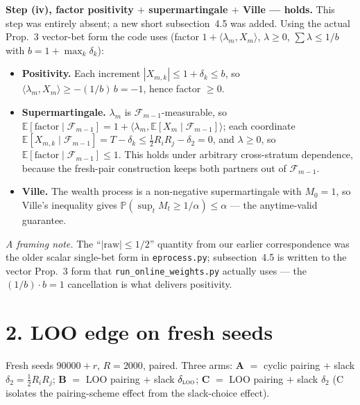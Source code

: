 \documentclass[11pt,a4paper]{article}
\begin{document}
\medskip
\noindent\textbf{Step (iv), factor positivity $+$ supermartingale $+$ Ville ---
holds.} This step was entirely absent; a new short subsection~4.5 was added.
Using the actual Prop.~3 vector-bet form the code uses
(factor $1 + \langle \lambda_m, X_m \rangle$, $\lambda \ge 0$,
$\sum \lambda \le 1/b$ with $b = 1 + \max_k \delta_k$):
\begin{itemize}
\item[(a)] \textbf{Positivity.} Each increment $|X_{m,k}| \le 1 + \delta_k \le b$,
  so $\langle \lambda_m, X_m \rangle \ge -(1/b)\,b = -1$, hence factor $\ge 0$.
\item[(b)] \textbf{Supermartingale.} $\lambda_m$ is
  $\mathcal{F}_{m-1}$-measurable, so
  $\mathbb{E}[\text{factor} \mid \mathcal{F}_{m-1}]
   = 1 + \langle \lambda_m, \mathbb{E}[X_m \mid \mathcal{F}_{m-1}] \rangle$;
  each coordinate
  $\mathbb{E}[X_{m,k} \mid \mathcal{F}_{m-1}] = T - \delta_k
   \le \tfrac12 R_i R_j - \delta_2 = 0$, and $\lambda \ge 0$, so
  $\mathbb{E}[\text{factor} \mid \mathcal{F}_{m-1}] \le 1$. This holds under
  arbitrary cross-stratum dependence, because the fresh-pair construction keeps
  both partners out of $\mathcal{F}_{m-1}$.
\item[(c)] \textbf{Ville.} The wealth process is a non-negative supermartingale
  with $M_0 = 1$, so Ville's inequality gives
  $\mathbb{P}\!\left(\sup_t M_t \ge 1/\alpha\right) \le \alpha$ --- the
  anytime-valid guarantee.
\end{itemize}

\noindent\emph{A framing note.} The ``$|\text{raw}| \le 1/2$'' quantity from our
earlier correspondence was the older scalar single-bet form in
\texttt{eprocess.py}; subsection~4.5 is written to the vector Prop.~3 form that
\texttt{run\_online\_weights.py} actually uses --- the $(1/b)\cdot b = 1$
cancellation is what delivers positivity.

\section*{2. LOO edge on fresh seeds}

Fresh seeds $90000 + r$, $R = 2000$, paired. Three arms:
\textbf{A} $=$ cyclic pairing $+$ slack $\delta_2 = \tfrac12 R_i R_j$;
\textbf{B} $=$ LOO pairing $+$ slack $\delta_{\textsc{loo}}$;
\textbf{C} $=$ LOO pairing $+$ slack $\delta_2$ (C isolates the pairing-scheme
effect from the slack-choice effect).
\end{document}
